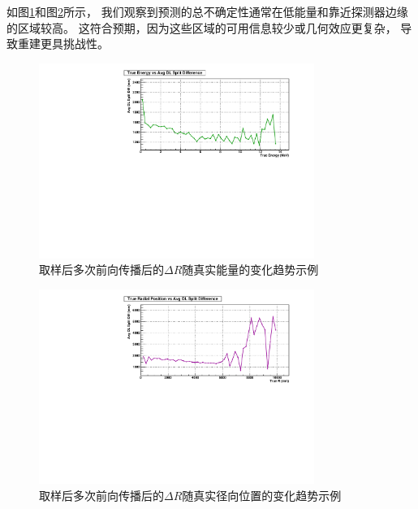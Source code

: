 

如图\ref{fig:uq_vs_energy}和图\ref{fig:uq_vs_radius}所示，
我们观察到预测的总不确定性通常在低能量和靠近探测器边缘的区域较高。
这符合预期，因为这些区域的可用信息较少或几何效应更复杂，
导致重建更具挑战性。
\begin{figure}[htbp]
    \centering
    \includegraphics[width=0.8\textwidth]{figures/energy_vs_split_diff_avg.pdf}
    \caption{取样后多次前向传播后的$\Delta R$随真实能量的变化趋势示例}
    \label{fig:uq_vs_energy}
\end{figure}

\begin{figure}[htbp]
    \centering
    \includegraphics[width=0.8\textwidth]{figures/posr_vs_split_diff_avg.pdf}
    \caption{取样后多次前向传播后的$\Delta R$随真实径向位置的变化趋势示例}
    \label{fig:uq_vs_radius}
\end{figure}

